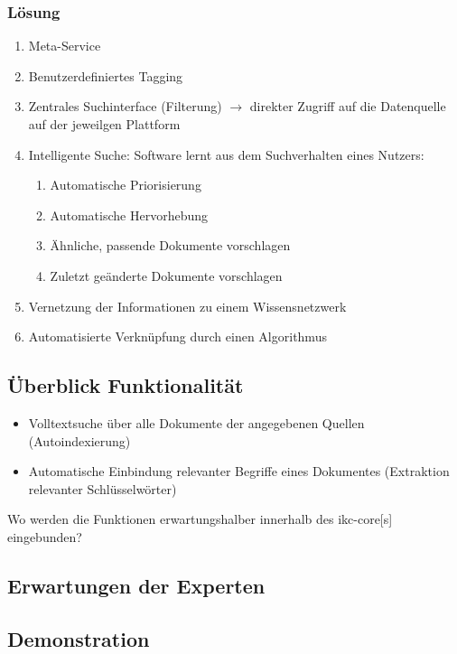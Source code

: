 \subsubsection{Lösung}

\begin{enumerate}
    \item Meta-Service
    \item Benutzerdefiniertes Tagging
    \item Zentrales Suchinterface (Filterung) $\rightarrow$ direkter Zugriff auf die Datenquelle auf der jeweilgen Plattform
    \item Intelligente Suche: Software lernt aus dem Suchverhalten eines Nutzers:
    \begin{enumerate}
        \item Automatische Priorisierung
        \item Automatische Hervorhebung
        \item Ähnliche, passende Dokumente vorschlagen
        \item Zuletzt geänderte Dokumente vorschlagen
    \end{enumerate}
    \item Vernetzung der Informationen zu einem Wissensnetzwerk
    \item Automatisierte Verknüpfung durch einen Algorithmus
\end{enumerate}

\subsection{Überblick Funktionalität}

\begin{itemize}
    \item Volltextsuche über alle Dokumente der angegebenen Quellen (Autoindexierung)
    \item Automatische Einbindung relevanter Begriffe eines Dokumentes (Extraktion relevanter Schlüsselwörter)
\end{itemize}

Wo werden die Funktionen erwartungshalber innerhalb des \gls{ikc-core}[s] eingebunden?

\subsection{Erwartungen der Experten}


\subsection{Demonstration}

